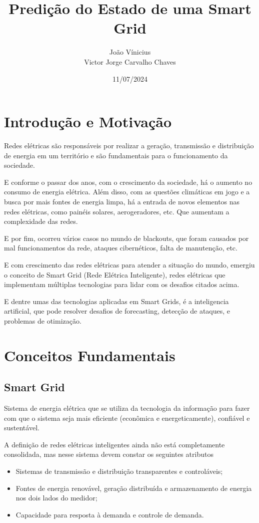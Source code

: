 \documentclass[a4paper,12pt]{article}
\title{Predição do Estado de uma Smart Grid}
\author{João Vínicius\\
Victor Jorge Carvalho Chaves}
\date{11/07/2024}
\begin{document}
\maketitle

\tableofcontents
\newpage

\section{Introdução e Motivação}

Redes elétricas são responsáveis por realizar a geração,
transmissão e distribuição de energia em um território
e são fundamentais para o funcionamento da sociedade.

E conforme o passar dos anos, com o crescimento da sociedade,
há o aumento no consumo de energia elétrica.
Além disso, com as questões climáticas em jogo e a busca por mais fontes de energia limpa,
há a entrada de novos elementos nas redes elétricas, como painéis solares, aerogeradores, etc. Que aumentam a complexidade das redes.

E por fim, ocorreu vários casos no mundo de blackouts, que foram causados por mal funcionamentos da rede, ataques cibernéticos, falta de manutenção, etc.

E com crescimento das redes elétricas para atender a situação do mundo, emergiu o conceito de Smart Grid (Rede Elétrica Inteligente), redes elétricas que implementam múltiplas tecnologias para lidar com os desafios citados acima.

E dentre umas das tecnologias aplicadas em Smart Grids, é a inteligencia artificial, que pode resolver desafios de forecasting, detecção de ataques, e problemas de otimização.

\section{Conceitos Fundamentais}
\subsection{Smart Grid}
Sistema de energia elétrica que se utiliza da tecnologia da informação para fazer com que o sistema seja mais eficiente (econômica e energeticamente), confiável e sustentável.

A definição de redes elétricas inteligentes ainda não está completamente consolidada, mas nesse sistema devem constar os seguintes atributos

\begin{itemize}
    \item Sistemas de transmissão e distribuição transparentes e controláveis;
    \item Fontes de energia renovável, geração distribuída e armazenamento de energia nos dois lados do medidor;
    \item Capacidade para resposta à demanda e controle de demanda.
\end{itemize}
\end{document}
